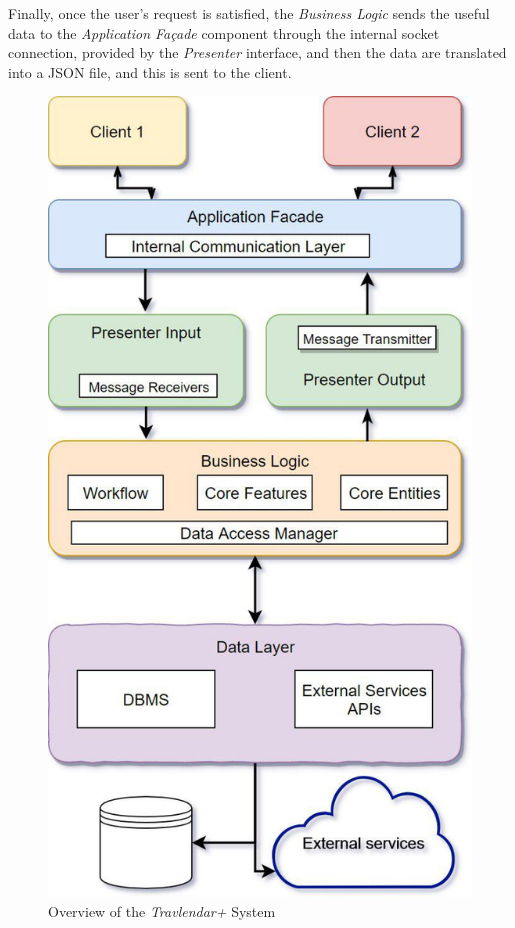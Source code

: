 Finally, once the user's request is satisfied, the \emph{Business Logic} sends the useful data to the \emph{Application Façade} component through the internal socket connection, provided by the \emph{Presenter} interface, and then the data are translated into a JSON file, and this is sent to the client.

\begin{figure}[H]
    \centering
    \includegraphics[scale=0.7]{Pictures/OverviewPictures/overviewDiagram.jpg}
    \caption{Overview of the \emph{Travlendar+} System}
\end{figure}
